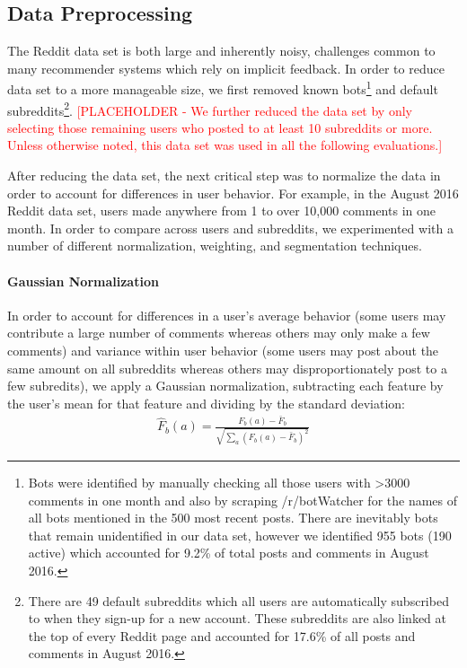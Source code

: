 \documentclass{article}
\begin{document}
\subsection{Data Preprocessing}\label{sec:data-prepros}
The Reddit data set is both large and inherently noisy, challenges common to many recommender systems which rely on implicit feedback.  In order to reduce data set to a more manageable size, we first removed known bots\footnote{Bots were identified by manually checking all those users with >3000 comments in one month and also by scraping /r/botWatcher for the names of all bots mentioned in the 500 most recent posts.  There are inevitably bots that remain unidentified in our data set, however we identified 955 bots (190 active) which accounted for 9.2\% of total posts and comments in August 2016.} and default subreddits\footnote{There are 49 default subreddits which all users are automatically subscribed to when they sign-up for a new account.  These subreddits are also linked at the top of every Reddit page and accounted for 17.6\% of all posts and comments in August 2016.}.  \textcolor{red}{[PLACEHOLDER - We further reduced the data set by only selecting those remaining users who posted to at least 10 subreddits or more.  Unless otherwise noted, this data set was used in all the following evaluations.]} 

After reducing the data set, the next critical step was to normalize the data in order to account for differences in user behavior.  For example, in the August 2016 Reddit data set, users made anywhere from 1 to over 10,000 comments in one month.  In order to compare across users and subreddits, we experimented with a number of different normalization, weighting, and segmentation techniques.

\paragraph{Gaussian Normalization} In order to account for differences in a user's average behavior (some users may contribute a large number of comments whereas others may only make a few comments) and variance within user behavior (some users may post about the same amount on all subreddits whereas others may disproportionately post to a few subredits), we apply a Gaussian normalization, subtracting each feature by the user's mean for that feature and dividing by the standard deviation: \begin{align*}
\hat{F}_{b}(a) = \frac{F_{b}(a) - \bar{F}_b}{\sqrt{\sum_{a}{(F_{b}(a) - \bar{F}_b)^2}}}
\end{align*}
\end{document}
